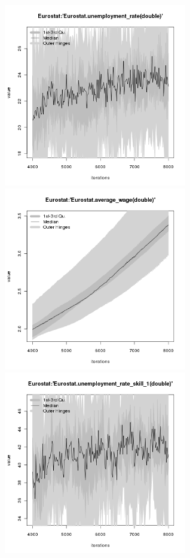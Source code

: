 \begin{figure}[H!]
\centering\leavevmode
\begin{minipage}{17cm}
\centering\leavevmode
\includegraphics[width=8cm]{./png/tax_0.05/Eurostat-unemployment_rate.png}
\includegraphics[width=8cm]{./png/tax_0.05/Eurostat-average_wage.png}\\
\includegraphics[width=8cm]{./png/tax_0.05/Eurostat-unemployment_rate_skill_1.png}

\end{minipage}
\end{figure}
